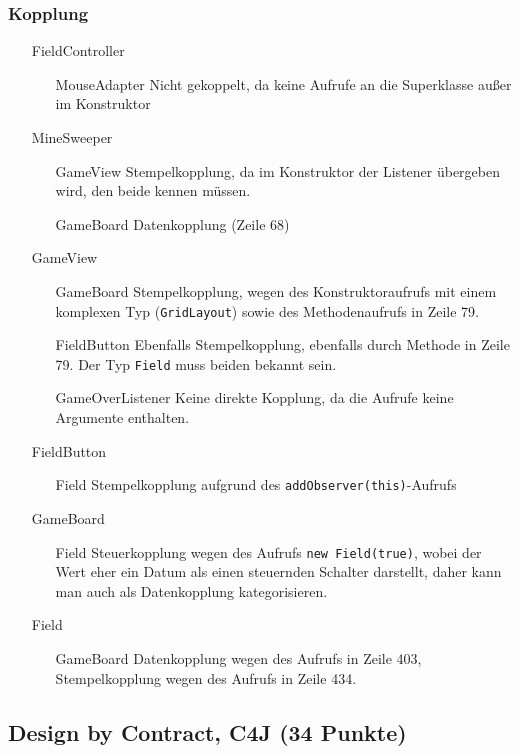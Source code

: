\documentclass{scrartcl}
\begin{document}
\subsubsection{Kopplung}

\begin{itemize}[font=\ttfamily,leftmargin=2cm,align=left]
   \item[FieldController] ~%
      \begin{itemize}[font=\ttfamily,align=left]
         \item[MouseAdapter] Nicht gekoppelt, da keine Aufrufe an die
            Superklasse außer im Konstruktor
      \end{itemize}
   \item[MineSweeper] ~ 
      \begin{itemize}[font=\ttfamily,align=left]
         \item[GameView] Stempelkopplung, da im Konstruktor der Listener
            übergeben wird, den beide kennen müssen.
         \item[GameBoard] Datenkopplung (Zeile 68)
      \end{itemize}
   \item[GameView] ~
      \begin{itemize}[font=\ttfamily,align=left]
         \item[GameBoard] Stempelkopplung, wegen des
            Konstruktoraufrufs mit einem komplexen Typ (\texttt{GridLayout})
            sowie des Methodenaufrufs in Zeile 79.
         \item[FieldButton] Ebenfalls Stempelkopplung, ebenfalls durch Methode
            in Zeile 79. Der Typ \texttt{Field} muss beiden bekannt sein.
         \item[GameOverListener] Keine direkte Kopplung, da die Aufrufe keine
            Argumente enthalten.
      \end{itemize}
   \item[FieldButton] ~
      \begin{itemize}[font=\ttfamily,align=left]
         \item[Field] Stempelkopplung aufgrund des
            \texttt{addObserver(this)}-Aufrufs
      \end{itemize}
   \item[GameBoard] ~
      \begin{itemize}[font=\ttfamily,align=left]
         \item[Field] Steuerkopplung wegen des Aufrufs \texttt{new Field(true)},
            wobei der Wert eher ein Datum als einen steuernden Schalter
            darstellt, daher kann man auch als Datenkopplung kategorisieren.
      \end{itemize}
   \item[Field] ~
      \begin{itemize}[font=\ttfamily,align=left]
         \item[GameBoard] Datenkopplung wegen des Aufrufs in Zeile 403,
            Stempelkopplung wegen des Aufrufs in Zeile 434.
      \end{itemize}
\end{itemize}
\subsection{Design by Contract, C4J (34 Punkte)}
\end{document}
